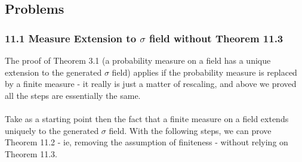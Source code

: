 \documentclass[12pt,a4paper]{article}
\newcommand{\1}[1]{\mathbbm{1}\left\{ #1 \right\}}
\begin{document}
\subsection{Problems}
\subsubsection{11.1 Measure Extension to $\sigma$ field without Theorem 11.3} The proof of Theorem 3.1 (a probability measure on a field has a unique extension to the generated $\sigma$ field) applies if the probability measure is replaced by a finite measure - it really is just a matter of rescaling, and above we proved all the steps are essentially the same.
\\\\
Take as a starting point then the fact that a finite measure on a field extends uniquely to the generated $\sigma$ field. With the following steps, we can prove Theorem 11.2 - ie, removing the assumption of finiteness - without relying on Theorem 11.3.
\end{document}
